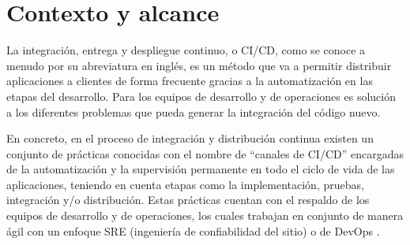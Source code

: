 \section{Contexto y alcance}




La integración, entrega y despliegue continuo, o CI/CD, como se conoce a menudo por su abreviatura en inglés, es un método que va a permitir distribuir aplicaciones a clientes de forma frecuente gracias a la automatización en las etapas del desarrollo. Para los equipos de desarrollo y de operaciones es solución a los diferentes problemas que pueda generar la integración del código nuevo.

En concreto, en el proceso de integración y distribución continua existen un conjunto de prácticas conocidas con el nombre de ``canales de CI/CD'' encargadas de la automatización y la supervisión permanente en todo el ciclo de vida de las aplicaciones, teniendo en cuenta etapas como la implementación, pruebas, integración y/o distribución. Estas prácticas cuentan con el respaldo de los equipos de desarrollo y de operaciones, los cuales trabajan en conjunto de manera ágil con un enfoque SRE (ingeniería de confiabilidad del sitio) o de DevOps \cite{redHatCICD}.

